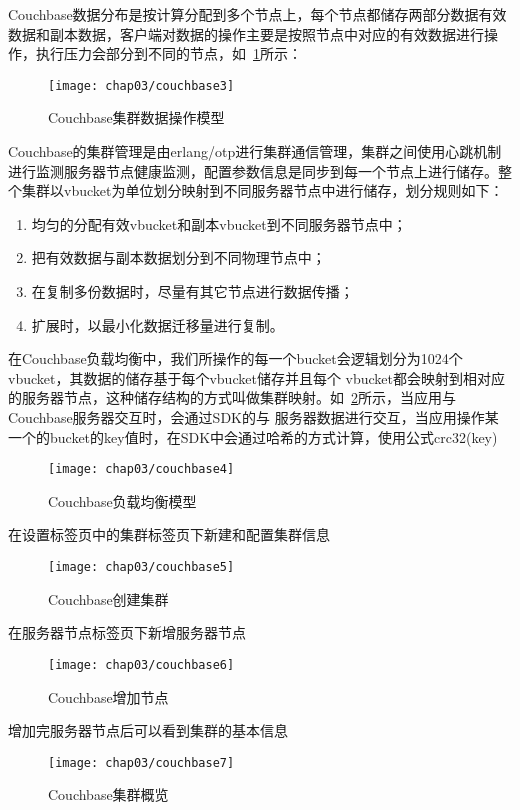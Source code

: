Couchbase数据分布是按计算分配到多个节点上，每个节点都储存两部分数据有效数据和副本数据，客户端对数据的操作主要是按照节点中对应的有效数据进行操作，执行压力会部分到不同的节点，如~\ref{fig:couchbase3}所示：
\begin{figure}[H] %
  \centering
  \texttt{[image: chap03/couchbase3]}
  \caption{Couchbase集群数据操作模型}
  \label{fig:couchbase3}
\end{figure}
Couchbase的集群管理是由erlang/otp进行集群通信管理，集群之间使用心跳机制进行监测服务器节点健康监测，配置参数信息是同步到每一个节点上进行储存。整个集群以vbucket为单位划分映射到不同服务器节点中进行储存，划分规则如下：
\begin{enumerate}
\item 均匀的分配有效vbucket和副本vbucket到不同服务器节点中；
\item 把有效数据与副本数据划分到不同物理节点中；
\item 在复制多份数据时，尽量有其它节点进行数据传播；
\item 扩展时，以最小化数据迁移量进行复制。
\end{enumerate}

在Couchbase负载均衡中，我们所操作的每一个bucket会逻辑划分为1024个vbucket，其数据的储存基于每个vbucket储存并且每个 vbucket都会映射到相对应的服务器节点，这种储存结构的方式叫做集群映射。如~\ref{fig:couchbase4}所示，当应用与Couchbase服务器交互时，会通过SDK的与 服务器数据进行交互，当应用操作某一个的bucket的key值时，在SDK中会通过哈希的方式计算，使用公式crc32(key)%
\begin{figure}[H] %
  \centering
  \texttt{[image: chap03/couchbase4]}
  \caption{Couchbase负载均衡模型}
  \label{fig:couchbase4}
\end{figure}
在设置标签页中的集群标签页下新建和配置集群信息
\begin{figure}[H] %
  \centering
  \texttt{[image: chap03/couchbase5]}
  \caption{Couchbase创建集群}
  \label{fig:couchbase5}
\end{figure}
在服务器节点标签页下新增服务器节点
\begin{figure}[H] %
  \centering
  \texttt{[image: chap03/couchbase6]}
  \caption{Couchbase增加节点}
  \label{fig:couchbase6}
\end{figure}
增加完服务器节点后可以看到集群的基本信息
\begin{figure}[H] %
  \centering
  \texttt{[image: chap03/couchbase7]}
  \caption{Couchbase集群概览}
  \label{fig:couchbase7}
\end{figure}

